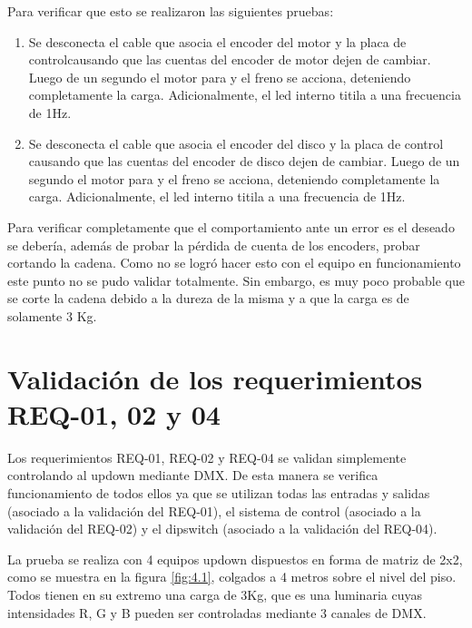 Para verificar que esto se realizaron las siguientes pruebas:
\begin{enumerate}
	\item Se desconecta el cable que asocia el encoder del motor y la placa de controlcausando que las cuentas del encoder de motor dejen de cambiar. Luego de un segundo el motor para y el freno se acciona, deteniendo completamente la carga. Adicionalmente, el led interno titila a una frecuencia de 1Hz.
	\item Se desconecta el cable que asocia el encoder del disco y la placa de control  causando que las cuentas del encoder de disco dejen de cambiar. Luego de un segundo el motor para y el freno se acciona, deteniendo completamente la carga. Adicionalmente, el led interno titila a una frecuencia de 1Hz.
\end{enumerate}
Para verificar completamente que el comportamiento ante un error es el deseado se debería, además de probar la pérdida de cuenta de los encoders, probar cortando la cadena. Como no se logró hacer esto con el equipo en funcionamiento este punto no se pudo validar totalmente. Sin embargo, es muy poco probable que se corte la cadena debido a la dureza de la misma y a que la carga es de solamente 3 Kg.

\section{Validación de los requerimientos REQ-01, 02 y 04} \label{sec:\thesection}
Los requerimientos REQ-01, REQ-02 y REQ-04 se validan simplemente controlando al updown mediante DMX. De esta manera se verifica funcionamiento de todos ellos ya que se utilizan todas las entradas y salidas (asociado a la validación del REQ-01), el sistema de control (asociado a la validación del REQ-02) y el dipswitch (asociado a la validación del REQ-04).

La prueba se realiza con 4 equipos updown dispuestos en forma de matriz de 2x2, como se muestra en la figura \ref{fig:4.1}, colgados a 4 metros sobre el nivel del piso. Todos tienen en su extremo una carga de 3Kg, que es una luminaria cuyas intensidades R, G y B pueden ser controladas mediante 3 canales de DMX.

